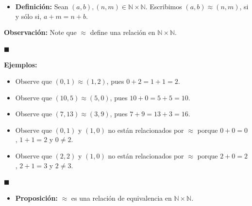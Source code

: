 \documentclass[10 pt]{article}
\begin{document}
\begin{itemize}
    \item \Large{\textbf{Definición:} Sean $(a,b),(n,m) \in \mathbb N \times \mathbb N$. Escribimos \underline{$(a,b) \approx (n,m)$}, si y sólo si, $a+m=n+b$.} \\
\end{itemize}

\Large{\textbf{Observación:} Note que $\approx$ define una relación en $\mathbb N \times \mathbb N$.} \\

\begin{flushright}
    $\blacksquare$
\end{flushright}

\Large{\textbf{Ejemplos:}} \\

\begin{itemize}
    \item \Large{Observe que $(0,1) \approx (1,2)$, pues $0+2=1+1=2$.} \\

    \item \Large{Observe que $(10,5) \approx (5,0)$, pues $10+0=5+5=10$.} \\

    \item \Large{Observe que $(7,13) \approx (3,9)$, pues $7+9=13+3=16$.} \\ 

    \item \Large{Observe que $(0,1)$ y $(1,0)$ no están relacionados por $\approx$ porque $0+0=0$, $1+1=2$ y $0 \neq 2$.} \\

    \item \Large{Observe que $(2,2)$ y $(1,0)$ no están relacionados por $\approx$ porque $2+0=2$, $2+1=3$ y $2 \neq 3$.} \\
\end{itemize}

\begin{flushright}
    $\blacksquare$
\end{flushright}

\begin{itemize}
    \item \Large{\textbf{Proposición:} $\approx$ es una relación de equivalencia en $\mathbb N \times \mathbb N$.} \\
\end{itemize}
\end{document}
